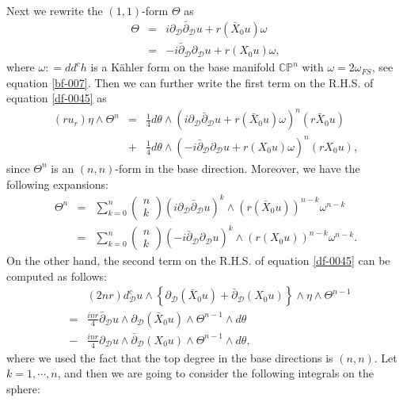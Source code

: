 \documentclass[a4paper,11pt]{amsart}
\numberwithin{equation}{section}
\def\dbar{\bar\partial}
\def\d{\partial}
\def\cD{{\mathcal D}}
\def\bC{{\mathbb C}}
\def\bP{{\mathbb P}}
\begin{document}
Next we rewrite the $(1,1)$-form $\Theta$ as 
\begin{eqnarray}
\label{df-005}
\Theta &=& i \d_{\cD} \dbar_{\cD} u  + r (\bar X_0 u) \omega
\nonumber\\
&=& - i  \dbar_{\cD} \d_{\cD} u  + r (X_0 u) \omega,
\end{eqnarray}
where $\omega: = dd^c h$ is a K\"ahler form on the base manifold $\bC\bP^n$ with $\omega = 2\omega_{FS}$, 
see equation \eqref{bf-007}. 
Then we can further write the first term on the R.H.S. of equation \eqref{df-0045} as 
\begin{eqnarray}
\label{df-006}
(ru_r) \eta \wedge \Theta^n &=& \frac{1}{4} d\theta\wedge \left( i \d_{\cD} \dbar_{\cD} u  + r (\bar X_0 u) \omega \right)^n (r \bar X_0 u)
\nonumber\\
&+ & \frac{1}{4} d\theta\wedge \left( - i \dbar_{\cD} \d_{\cD} u  + r ( X_0 u) \omega \right)^n (r X_0 u),
\end{eqnarray}
since $\Theta^n$ is an $(n,n)$-form in the base direction. 
Moreover, we have the following expansions: 
\begin{eqnarray}
\label{df-007}
\Theta^n &=& 
\sum_{k=0}^n   \left( \begin{array}{c} n \\ k \end{array} \right) ( i \d_{\cD} \dbar_{\cD} u )^k \wedge \left( r (\bar X_0 u)  \right)^{n-k} \omega^{n-k}
\nonumber\\
&=&
\sum_{k=0}^n   \left( \begin{array}{c} n \\ k \end{array} \right) ( - i \dbar_{\cD} \d_{\cD} u )^k \wedge \left( r (X_0 u)  \right)^{n-k}\omega^{n-k}.
\end{eqnarray}
On the other hand, the second term on the R.H.S. of equation \eqref{df-0045} can be computed as follows:  
\begin{eqnarray}
\label{df-008}
&& (2 n r) d^c_{\cD} u \wedge \left\{ \d_{\cD} (\bar X_0 u) + \dbar_{\cD} (X_0 u) \right\} \wedge \eta \wedge \Theta^{n-1}
\nonumber\\
&=& \frac{inr}{4} \dbar_{\cD} u \wedge \d_{\cD} (\bar X_0 u) \wedge \Theta^{n-1} \wedge d\theta
\nonumber\\
&-& \frac{inr}{4} \d_{\cD} u \wedge \dbar_{\cD} (X_0 u) \wedge \Theta^{n-1} \wedge d\theta, 
\end{eqnarray}
where we used the fact that the top degree in the base directions is $(n,n)$. 
Let $k=1,\cdots, n$, and then we are going to consider the following integrals on the sphere: 
\end{document}
